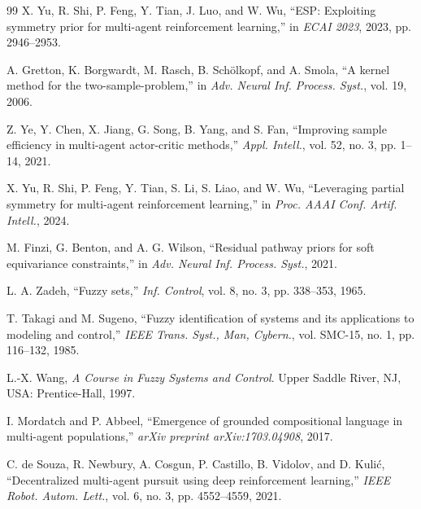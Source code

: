 \documentclass[lettersize,journal]{IEEEtran}
\begin{document}
\begin{thebibliography}{99}
X. Yu, R. Shi, P. Feng, Y. Tian, J. Luo, and W. Wu, ``ESP: Exploiting symmetry prior for multi-agent reinforcement learning,'' in \emph{ECAI 2023}, 2023, pp. 2946--2953.

A. Gretton, K. Borgwardt, M. Rasch, B. Sch{\"o}lkopf, and A. Smola, ``A kernel method for the two-sample-problem,'' in \emph{Adv. Neural Inf. Process. Syst.}, vol. 19, 2006.

Z. Ye, Y. Chen, X. Jiang, G. Song, B. Yang, and S. Fan, ``Improving sample efficiency in multi-agent actor-critic methods,'' \emph{Appl. Intell.}, vol. 52, no. 3, pp. 1--14, 2021.

X. Yu, R. Shi, P. Feng, Y. Tian, S. Li, S. Liao, and W. Wu, ``Leveraging partial symmetry for multi-agent reinforcement learning,'' in \emph{Proc. AAAI Conf. Artif. Intell.}, 2024.

M. Finzi, G. Benton, and A. G. Wilson, ``Residual pathway priors for soft equivariance constraints,'' in \emph{Adv. Neural Inf. Process. Syst.}, 2021.

L. A. Zadeh, ``Fuzzy sets,'' \emph{Inf. Control}, vol. 8, no. 3, pp. 338--353, 1965.

T. Takagi and M. Sugeno, ``Fuzzy identification of systems and its applications to modeling and control,'' \emph{IEEE Trans. Syst., Man, Cybern.}, vol. SMC-15, no. 1, pp. 116--132, 1985.

L.-X. Wang, \emph{A Course in Fuzzy Systems and Control}. Upper Saddle River, NJ, USA: Prentice-Hall, 1997.

I. Mordatch and P. Abbeel, ``Emergence of grounded compositional language in multi-agent populations,'' \emph{arXiv preprint arXiv:1703.04908}, 2017.

C. de Souza, R. Newbury, A. Cosgun, P. Castillo, B. Vidolov, and D. Kuli\'{c}, ``Decentralized multi-agent pursuit using deep reinforcement learning,'' \emph{IEEE Robot. Autom. Lett.}, vol. 6, no. 3, pp. 4552--4559, 2021.

\end{thebibliography}
\end{document}

